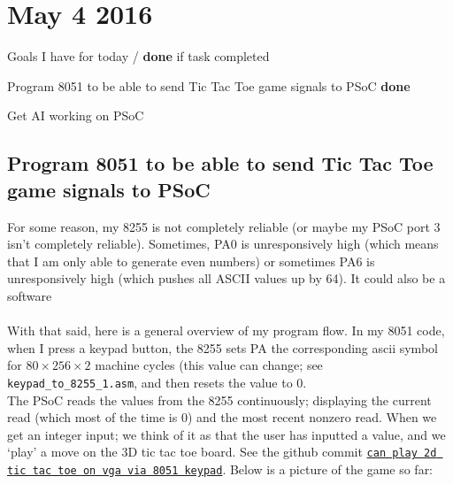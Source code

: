 \documentclass[12pt,twoside]{article}
\newenvironment{tight_itemize}{
\begin{itemize}
  \setlength{\itemsep}{0pt}
  \setlength{\parskip}{0pt}
}{\end{itemize}}
\begin{document}

\newpage
\section{May 4 2016}

Goals I have for today / {\bf done} if task completed
\begin{tight_itemize}
\item Program 8051 to be able to send Tic Tac Toe game signals to PSoC {\bf done}
\item Get AI working on PSoC 
\end{tight_itemize}

\subsection{Program 8051 to be able to send Tic Tac Toe game signals to PSoC}
For some reason, my 8255 is not completely reliable (or maybe my PSoC port 3 isn't completely reliable). Sometimes, PA0 is unresponsively high (which means that I am only able to generate even numbers) or sometimes PA6 is unresponsively high (which pushes all ASCII values up by 64). It could also be a software 
\\ 
\\ With that said, here is a general overview of my program flow. In my 8051 code, when I press a keypad button, the 8255 sets PA the corresponding ascii symbol for $80\times256\times2$ machine cycles (this value can change; see \texttt{keypad\_to\_8255\_1.asm}, and then resets the value to 0. 
\\ The PSoC reads the values from the 8255 continuously; displaying the current read (which most of the time is 0) and the most recent nonzero read. When we get an integer input; we think of it as that the user has inputted a value, and we `play' a move on the 3D tic tac toe board. See the github commit \href{https://github.com/qandrew/6.115-final-project/commit/6c326fa8a2db2a654800f6be3b9bfd5749913904}{\texttt{can play 2d tic tac toe on vga via 8051 keypad}}. Below is a picture of the game so far: 
\end{document}
